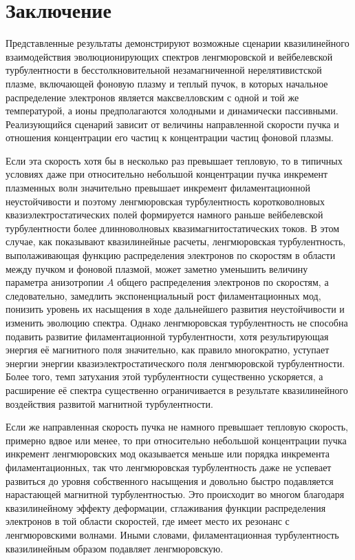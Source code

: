 \section{Заключение}

Представленные результаты демонстрируют возможные сценарии квазилинейного взаимодействия эволюционирующих спектров ленгмюровской и вейбелевской турбулентности в бесстолкновительной незамагниченной нерелятивистской плазме, включающей фоновую плазму и теплый пучок, в которых начальное распределение электронов является максвелловским с одной и той же температурой, а ионы предполагаются холодными и динамически пассивными. Реализующийся сценарий зависит от величины направленной скорости пучка и отношения концентрации его частиц к концентрации частиц фоновой плазмы. 

Если эта скорость хотя бы в несколько раз превышает тепловую, то в типичных условиях даже при относительно небольшой концентрации пучка инкремент плазменных волн значительно превышает инкремент филаментационной неустойчивости и поэтому ленгмюровская турбулентность коротковолновых квазиэлектростатических полей формируется намного раньше вейбелевской  турбулентности более длинноволновых квазимагнитостатических токов. В этом случае, как показывают квазилинейные расчеты, ленгмюровская турбулентность, выполаживающая функцию распределения электронов по скоростям в области между пучком и фоновой плазмой, может заметно уменьшить величину параметра анизотропии $A$ общего распределения электронов по скоростям, а следовательно, замедлить экспоненциальный рост филаментационных мод, понизить уровень их насыщения в ходе дальнейшего развития неустойчивости и изменить эволюцию спектра. Однако ленгмюровская турбулентность не способна подавить развитие филаментационной турбулентности, хотя результирующая энергия её магнитного поля значительно, как правило многократно, уступает энергии энергии квазиэлектростатического поля ленгмюровской турбулентности. Более того, темп затухания этой турбулентности существенно ускоряется, а расширение её спектра существенно ограничивается в результате квазилинейного воздействия развитой магнитной турбулентности.

Если же направленная скорость пучка не намного превышает тепловую скорость, примерно вдвое или менее, то при относительно небольшой концентрации пучка инкремент ленгмюровских мод оказывается меньше или порядка инкремента филаментационных, так что ленгмюровская турбулентность даже не успевает развиться до уровня собственного насыщения и довольно быстро подавляется нарастающей магнитной турбулентностью. Это происходит во многом благодаря квазилинейному эффекту деформации, сглаживания функции распределения электронов в той области скоростей, где имеет место их резонанс с ленгмюровскими волнами. Иными словами, филаментационная турбулентность квазилинейным образом подавляет ленгмюровскую. 

